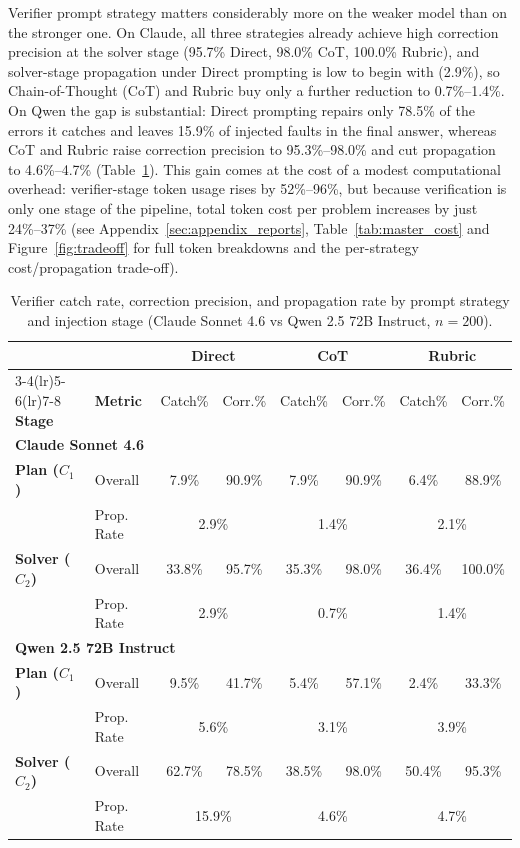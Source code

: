 \documentclass[11pt]{article}
\begin{document}
Verifier prompt strategy matters considerably more on the weaker model than on the stronger one. On Claude, all three strategies already achieve high correction precision at the solver stage (95.7\% Direct, 98.0\% CoT, 100.0\% Rubric), and solver-stage propagation under Direct prompting is low to begin with (2.9\%), so Chain-of-Thought (CoT) and Rubric buy only a further reduction to 0.7\%--1.4\%. On Qwen the gap is substantial: Direct prompting repairs only 78.5\% of the errors it catches and leaves 15.9\% of injected faults in the final answer, whereas CoT and Rubric raise correction precision to 95.3\%--98.0\% and cut propagation to 4.6\%--4.7\% (Table~\ref{tab:strategy}). This gain comes at the cost of a modest computational overhead: verifier-stage token usage rises by 52\%--96\%, but because verification is only one stage of the pipeline, total token cost per problem increases by just 24\%--37\% (see Appendix~\ref{sec:appendix_reports}, Table~\ref{tab:master_cost} and Figure~\ref{fig:tradeoff} for full token breakdowns and the per-strategy cost/propagation trade-off).

\begin{table}[H]
\centering\small
\begin{tabular}{llcccccc}
\toprule
& & \multicolumn{2}{c}{\textbf{Direct}} & \multicolumn{2}{c}{\textbf{CoT}} & \multicolumn{2}{c}{\textbf{Rubric}} \\
\cmidrule(lr){3-4}\cmidrule(lr){5-6}\cmidrule(lr){7-8}
\textbf{Stage} & \textbf{Metric} & Catch\% & Corr.\% & Catch\% & Corr.\% & Catch\% & Corr.\% \\
\midrule
\multicolumn{8}{l}{\textbf{Claude Sonnet 4.6}} \\
\textbf{Plan ($C_1$)} & Overall & 7.9\% & 90.9\% & 7.9\% & 90.9\% & 6.4\% & 88.9\% \\
& Prop. Rate & \multicolumn{2}{c}{2.9\%} & \multicolumn{2}{c}{1.4\%} & \multicolumn{2}{c}{2.1\%} \\
\textbf{Solver ($C_2$)} & Overall & 33.8\% & 95.7\% & 35.3\% & 98.0\% & 36.4\% & 100.0\% \\
& Prop. Rate & \multicolumn{2}{c}{2.9\%} & \multicolumn{2}{c}{0.7\%} & \multicolumn{2}{c}{1.4\%} \\
\midrule
\multicolumn{8}{l}{\textbf{Qwen 2.5 72B Instruct}} \\
\textbf{Plan ($C_1$)} & Overall & 9.5\% & 41.7\% & 5.4\% & 57.1\% & 2.4\% & 33.3\% \\
& Prop. Rate & \multicolumn{2}{c}{5.6\%} & \multicolumn{2}{c}{3.1\%} & \multicolumn{2}{c}{3.9\%} \\
\textbf{Solver ($C_2$)} & Overall & 62.7\% & 78.5\% & 38.5\% & 98.0\% & 50.4\% & 95.3\% \\
& Prop. Rate & \multicolumn{2}{c}{15.9\%} & \multicolumn{2}{c}{4.6\%} & \multicolumn{2}{c}{4.7\%} \\
\bottomrule
\end{tabular}
\caption{Verifier catch rate, correction precision, and propagation rate by prompt strategy and injection stage (Claude Sonnet 4.6 vs Qwen 2.5 72B Instruct, $n=200$).}\label{tab:strategy}
\end{table}
\end{document}
